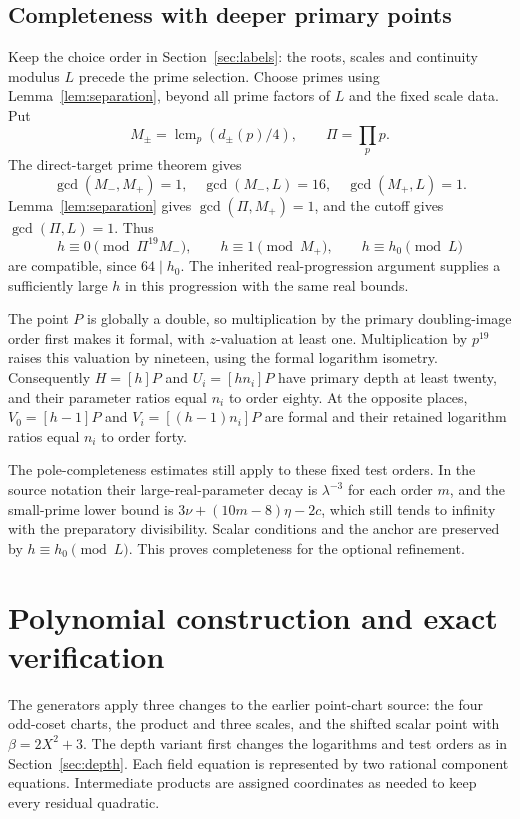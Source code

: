 \documentclass[11pt]{article}
\begin{document}
\subsection{Completeness with deeper primary points}
Keep the choice order in Section~\ref{sec:labels}: the roots, scales and continuity modulus $L$ precede the prime selection. Choose primes using Lemma~\ref{lem:separation}, beyond all prime factors of $L$ and the fixed scale data. Put
\[
 M_\pm=\mathop{\mathrm{lcm}}_p(d_\pm(p)/4),\qquad \Pi=\prod_p p.
\]
The direct-target prime theorem gives
\[
 \gcd(M_-,M_+)=1,\quad
 \gcd(M_-,L)=16,\quad\gcd(M_+,L)=1.
\]
Lemma~\ref{lem:separation} gives $\gcd(\Pi,M_+)=1$, and the cutoff gives $\gcd(\Pi,L)=1$. Thus
\[
 h\equiv0\pmod{\Pi^{19}M_-},\qquad
 h\equiv1\pmod{M_+},\qquad h\equiv h_0\pmod L
\]
are compatible, since $64\mid h_0$. The inherited real-progression argument supplies a sufficiently large $h$ in this progression with the same real bounds.

The point $P$ is globally a double, so multiplication by the primary doubling-image order first makes it formal, with $z$-valuation at least one. Multiplication by $p^{19}$ raises this valuation by nineteen, using the formal logarithm isometry. Consequently $H=[h]P$ and $U_i=[hn_i]P$ have primary depth at least twenty, and their parameter ratios equal $n_i$ to order eighty. At the opposite places, $V_0=[h-1]P$ and $V_i=[(h-1)n_i]P$ are formal and their retained logarithm ratios equal $n_i$ to order forty.

The pole-completeness estimates still apply to these fixed test orders. In the source notation their large-real-parameter decay is $\lambda^{-3}$ for each order $m$, and the small-prime lower bound is $3\nu+(10m-8)\eta-2c$, which still tends to infinity with the preparatory divisibility. Scalar conditions and the anchor are preserved by $h\equiv h_0\pmod L$. This proves completeness for the optional refinement.

\section{Polynomial construction and exact verification}
The generators apply three changes to the earlier point-chart source: the four odd-coset charts, the product and three scales, and the shifted scalar point with $\beta=2X^2+3$. The depth variant first changes the logarithms and test orders as in Section~\ref{sec:depth}. Each field equation is represented by two rational component equations. Intermediate products are assigned coordinates as needed to keep every residual quadratic.
\end{document}
